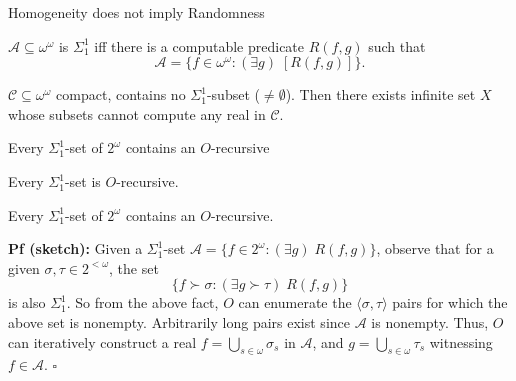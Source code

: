 \begin{frame}{Homogeneity does not imply Randomness}
  \begin{center}
  \end{center}

  \pause
  \begin{define*}
    $\mathcal{A}\subseteq\omega^\omega$ is $\Sigma_1^1$ iff there is a
    computable predicate $R(f,g)$ such that
    \[\mathcal{A} =\{f\in\omega^\omega: (\exists g)\; [R(f,g)]\}.\]
  \end{define*}

  \pause
  \begin{main-thm*}
    $\mathcal{C}\subseteq\omega^\omega$ compact, contains no
    $\Sigma_1^1$-subset ($\neq\emptyset$). Then there exists infinite set
    $X$ whose subsets cannot compute any real in $\mathcal{C}$.
  \end{main-thm*}
\end{frame}

\begin{frame}{Every $\Sigma_1^1$-set of $2^\omega$ contains an $O$-recursive}
  \begin{fact}
    Every $\Sigma^1_1$-set is $O$-recursive.
  \end{fact}

  \pause
  \begin{lemma}
    Every $\Sigma_1^1$-set of $2^\omega$ contains an $O$-recursive.
  \end{lemma}

  \pause
  \textbf{Pf (sketch):} Given a $\Sigma_1^1$-set $\mathcal{A}
  =\{f\in2^\omega: (\exists g)\; R(f,g)\}$, observe that for a given
  $\sigma,\tau\in 2^{<\omega}$, the set
  \[\{f\succ \sigma: (\exists g\succ\tau)\; R(f,g)\}\]
  is also $\Sigma^1_1$. So from the above fact, $O$ can enumerate the
  $\langle \sigma,\tau \rangle$ pairs for which the above set is nonempty.
  Arbitrarily long pairs exist since $\mathcal{A}$ is nonempty. Thus, $O$
  can iteratively construct a real $f=\bigcup_{s\in\omega} \sigma_s$ in
  $\mathcal{A}$, and $g=\bigcup_{s\in\omega} \tau_s$ witnessing
  $f\in\mathcal{A}$. $\square$
\end{frame}

